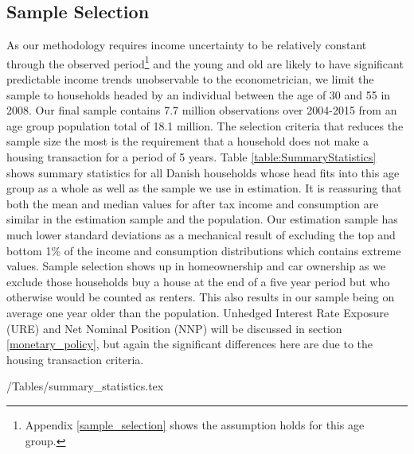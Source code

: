 \documentclass[titlepage]{\econtex}\newcommand{\texname}{ConsumptionHeterogeneity}
\begin{document}
\subsection{Sample Selection}
As our methodology requires income uncertainty to be relatively constant through the observed period\footnote{Appendix \ref{sample_selection} shows the assumption holds for this age group.} and the young and old are likely to have significant predictable income trends unobservable to the econometrician, we limit the sample to households headed by an individual between the age of 30 and 55 in 2008. Our final sample contains 7.7 million observations over 2004-2015 from an age group population total of 18.1 million. The selection criteria that reduces the sample size the most is the requirement that a household does not make a housing transaction for a period of 5 years. Table \ref{table:SummaryStatistics} shows summary statistics for all Danish households whose head fits into this age group as a whole as well as the sample we use in estimation. It is reassuring that both the mean and median values for after tax income and consumption are similar in the estimation sample and the population. Our estimation sample has much lower standard deviations as a mechanical result of excluding the top and bottom 1\% of the income and consumption distributions which contains extreme values. Sample selection shows up in homeownership and car ownership as we exclude those households buy a house at the end of a five year period but who otherwise would be counted as renters. This also results in our sample being on average one year older than the population. Unhedged Interest Rate Exposure (URE) and Net Nominal Position (NNP) will be discussed in section \ref{monetary_policy}, but again the significant differences here are due to the housing transaction criteria. 
\begin{center} 
	\label{table:SummaryStatistics}
	\econtexRoot/Tables/summary_statistics.tex 
\end{center}
\end{document}

